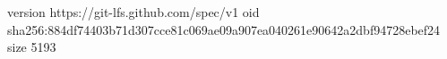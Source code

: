 version https://git-lfs.github.com/spec/v1
oid sha256:884df74403b71d307cce81c069ae09a907ea040261e90642a2dbf94728ebef24
size 5193
